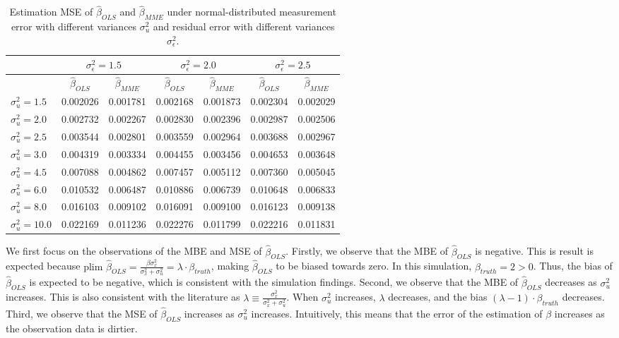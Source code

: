 \documentclass{article}
\begin{document}
\begin{table}[ht]
    \centering
    \caption{Estimation MSE of $\hat{\beta}_{OLS}$ and $\hat{\beta}_{MME}$ under normal-distributed measurement error with different variances $\sigma^2_u$ and residual error with different variances $\sigma^2_\epsilon$.}
    \label{Tab:MSE_normal}
    \begin{tabular}[t]{lcccccc}
        \hline
        &\multicolumn{2}{c}{$\sigma^2_\epsilon=1.5$}&\multicolumn{2}{c}{$\sigma^2_\epsilon=2.0$}&\multicolumn{2}{c}{$\sigma^2_\epsilon=2.5$}\\
        \hline
        &$\hat{\beta}_{OLS}$&$\hat{\beta}_{MME}$&$\hat{\beta}_{OLS}$&$\hat{\beta}_{MME}$&$\hat{\beta}_{OLS}$&$\hat{\beta}_{MME}$\\
        \hline
        $\sigma^2_u = 1.5$&0.002026&0.001781&0.002168&0.001873&0.002304&0.002029\\
        $\sigma^2_u = 2.0$&0.002732&0.002267&0.002830&0.002396&0.002987&0.002506\\
        $\sigma^2_u = 2.5$&0.003544&0.002801&0.003559&0.002964&0.003688&0.002967\\
        $\sigma^2_u = 3.0$&0.004319&0.003334&0.004455&0.003456&0.004653&0.003648\\
        $\sigma^2_u = 4.5$&0.007088&0.004862&0.007457&0.005112&0.007360&0.005045\\
        $\sigma^2_u = 6.0$&0.010532&0.006487&0.010886&0.006739&0.010648&0.006833\\
        $\sigma^2_u = 8.0$&0.016103&0.009102&0.016091&0.009100&0.016123&0.009138\\
        $\sigma^2_u = 10.0$&0.022169&0.011236&0.022276&0.011799&0.022216&0.011831\\
        \hline
    \end{tabular}
\end{table}

We first focus on the observations of the MBE and MSE of $\hat{\beta}_{OLS}$.
Firstly, we observe that the MBE of $\hat{\beta}_{OLS}$ is negative.
This is result is expected because $\textrm{plim } \hat{\beta}_{OLS} = \frac{\beta \sigma^2_x}{\sigma^2_x + \sigma^2_u} = \lambda \cdot \beta_{truth}$,
making $\hat{\beta}_{OLS}$ to be biased towards zero.
In this simulation, $\beta_{truth} = 2 > 0$.
Thus, the bias of $\hat{\beta}_{OLS}$ is expected to be negative, which is consistent with the simulation findings.
Second, we observe that the MBE of $\hat{\beta}_{OLS}$ decreases as $\sigma^2_u$ increases.
This is also consistent with the literature as $\lambda \equiv \frac{\sigma_x^2}{\sigma_x^2 + \sigma_u^2}$.
When $\sigma^2_u$ increases, $\lambda$ decreases, and the bias $(\lambda-1) \cdot \beta_{truth}$ decreases.
Third, we observe that the MSE of $\hat{\beta}_{OLS}$ increases as $\sigma^2_u$ increases. Intuitively, this means that the error of the estimation of $\beta$ increases as the observation data is dirtier. 
\end{document}
